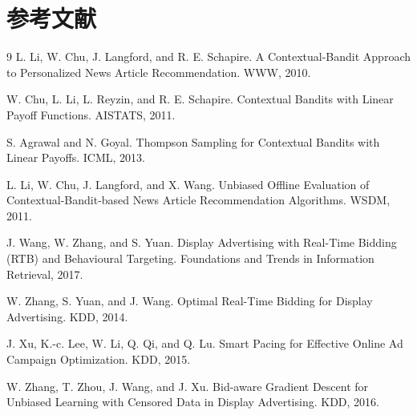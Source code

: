 \documentclass[uplatex,dvipdfmx,11pt,a4paper]{bxjsarticle}
\begin{document}
\section{参考文献}
\begin{thebibliography}{9}
L. Li, W. Chu, J. Langford, and R. E. Schapire.
\newblock A Contextual-Bandit Approach to Personalized News Article Recommendation.
\newblock WWW, 2010.

W. Chu, L. Li, L. Reyzin, and R. E. Schapire.
\newblock Contextual Bandits with Linear Payoff Functions.
\newblock AISTATS, 2011.

S. Agrawal and N. Goyal.
\newblock Thompson Sampling for Contextual Bandits with Linear Payoffs.
\newblock ICML, 2013.

L. Li, W. Chu, J. Langford, and X. Wang.
\newblock Unbiased Offline Evaluation of Contextual-Bandit-based News Article Recommendation Algorithms.
\newblock WSDM, 2011.

J. Wang, W. Zhang, and S. Yuan.
\newblock Display Advertising with Real-Time Bidding (RTB) and Behavioural Targeting.
\newblock Foundations and Trends in Information Retrieval, 2017.

W. Zhang, S. Yuan, and J. Wang.
\newblock Optimal Real-Time Bidding for Display Advertising.
\newblock KDD, 2014.

J. Xu, K.-c. Lee, W. Li, Q. Qi, and Q. Lu.
\newblock Smart Pacing for Effective Online Ad Campaign Optimization.
\newblock KDD, 2015.

W. Zhang, T. Zhou, J. Wang, and J. Xu.
\newblock Bid-aware Gradient Descent for Unbiased Learning with Censored Data in Display Advertising.
\newblock KDD, 2016.
\end{thebibliography}
\end{document}
